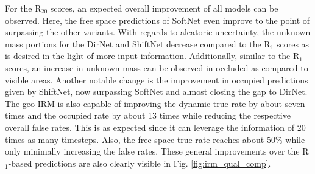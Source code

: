 For the R$_{20}$ scores, an expected overall improvement of all models can be observed. Here, the free space predictions of SoftNet even improve to the point of surpassing the other variants. With regards to aleatoric uncertainty, the unknown mass portions for the DirNet and ShiftNet decrease compared to the R$_1$ scores as is desired in the light of more input information. Additionally, similar to the R$_1$ scores, an increase in unknown mass can be observed in occluded as compared to visible areas. Another notable change is the improvement in occupied predictions given by ShiftNet, now surpassing SoftNet and almost closing the gap to DirNet. The geo IRM is also capable of improving the dynamic true rate by about seven times and the occupied rate by about 13 times while reducing the respective overall false rates. This is as expected since it can leverage the information of 20 times as many timesteps. Also, the free space true rate reaches about 50$\%$ while only minimally increasing the false rates. These general improvements over the R$_1$-based predictions are also clearly visible in Fig. \ref{fig:irm_qual_comp}. 
